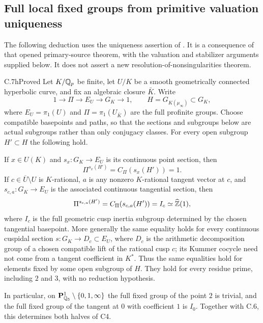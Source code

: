 \subsection{Full local fixed groups from primitive valuation uniqueness}

The following deduction uses the uniqueness assertion of
\citet[Theorem A; Proposition 2.4(vii)]{D_MochizukiTsujimura2024}.
It is a consequence of that opened primary-source theorem, with the valuation
and stabilizer arguments supplied below. It does not assert a new
resolution-of-nonsingularities theorem.

\begin{claim}{C.7h}{Proved}
Let $K/\mathbb Q_p$ be finite, let $U/K$ be a smooth geometrically connected
hyperbolic curve, and fix an algebraic closure $\bar K$. Write
\[
 1\longrightarrow\Pi\longrightarrow E_U\longrightarrow G_K
 \longrightarrow1,\qquad
 H=G_{K(\mu_\infty)}\subset G_K,
\]
where $E_U=\pi_1(U)$ and $\Pi=\pi_1(U_{\bar K})$ are the full
profinite groups. Choose compatible basepoints and paths, so that the
sections and subgroups below are actual subgroups rather than only
conjugacy classes. For every open subgroup $H'\subset H$ the following
hold.

If $x\in U(K)$ and $s_x:G_K\to E_U$ is its continuous point section,
then
\[
 \Pi^{s_x(H')}=C_\Pi(s_x(H'))=1.
\]
If $c\in\overline U\setminus U$ is $K$-rational, $a$ is any nonzero
$K$-rational tangent vector at $c$, and $s_{c,a}:G_K\to E_U$ is the
associated continuous tangential section, then
\[
 \Pi^{s_{c,a}(H')}=C_\Pi(s_{c,a}(H'))=I_c
 \simeq\widehat{\mathbb Z}(1),
\]
where $I_c$ is the full geometric cusp inertia subgroup determined by the
chosen tangential basepoint. More generally the same equality holds for
every continuous cuspidal section $s:G_K\to D_c\subset E_U$, where
$D_c$ is the arithmetic decomposition group of a chosen compatible lift
of the rational cusp $c$; its Kummer cocycle need not come from a tangent
coefficient in $K^*$. Thus the same equalities hold for elements
fixed by some open subgroup of $H$. They hold for every residue prime,
including $2$ and $3$, with no reduction hypothesis.

In particular, on
$\mathbf P^1_{\mathbb Q_5}\setminus\{0,1,\infty\}$ the full fixed group of
the point $2$ is trivial, and the full fixed group of the tangent at $0$
with coefficient $1$ is $I_0$. Together with C.6, this determines both
halves of C4.
\end{claim}
